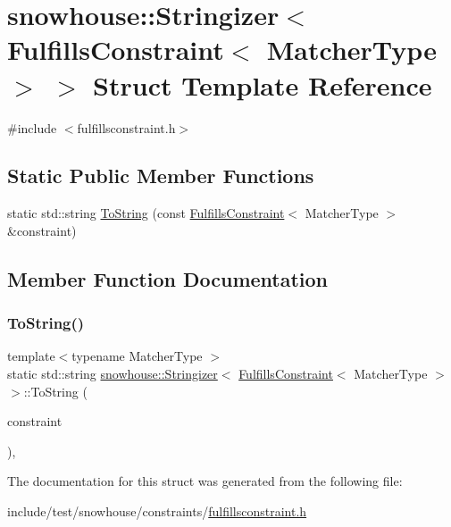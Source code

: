 \hypertarget{structsnowhouse_1_1Stringizer_3_01FulfillsConstraint_3_01MatcherType_01_4_01_4}{}\section{snowhouse\+::Stringizer$<$ Fulfills\+Constraint$<$ Matcher\+Type $>$ $>$ Struct Template Reference}
\label{structsnowhouse_1_1Stringizer_3_01FulfillsConstraint_3_01MatcherType_01_4_01_4}


{\ttfamily \#include $<$fulfillsconstraint.\+h$>$}

\subsection*{Static Public Member Functions}
\begin{DoxyCompactItemize}
\item 
static std\+::string \mbox{\hyperlink{structsnowhouse_1_1Stringizer_3_01FulfillsConstraint_3_01MatcherType_01_4_01_4_a0bce4ff399b7f9500698cc2b89047e1c}{To\+String}} (const \mbox{\hyperlink{structsnowhouse_1_1FulfillsConstraint}{Fulfills\+Constraint}}$<$ Matcher\+Type $>$ \&constraint)
\end{DoxyCompactItemize}


\subsection{Member Function Documentation}
\mbox{\label{structsnowhouse_1_1Stringizer_3_01FulfillsConstraint_3_01MatcherType_01_4_01_4_a0bce4ff399b7f9500698cc2b89047e1c}} 
\subsubsection{\texorpdfstring{ToString()}{ToString()}}
{\footnotesize\ttfamily template$<$typename Matcher\+Type $>$ \\
static std\+::string \mbox{\hyperlink{structsnowhouse_1_1Stringizer}{snowhouse\+::\+Stringizer}}$<$ \mbox{\hyperlink{structsnowhouse_1_1FulfillsConstraint}{Fulfills\+Constraint}}$<$ Matcher\+Type $>$ $>$\+::To\+String (\begin{DoxyParamCaption}\item[{const \mbox{\hyperlink{structsnowhouse_1_1FulfillsConstraint}{Fulfills\+Constraint}}$<$ Matcher\+Type $>$ \&}]{constraint }\end{DoxyParamCaption})\hspace{0.3cm}{\ttfamily [inline]}, {\ttfamily [static]}}



The documentation for this struct was generated from the following file\+:\begin{DoxyCompactItemize}
\item 
include/test/snowhouse/constraints/\mbox{\hyperlink{fulfillsconstraint_8h}{fulfillsconstraint.\+h}}\end{DoxyCompactItemize}
